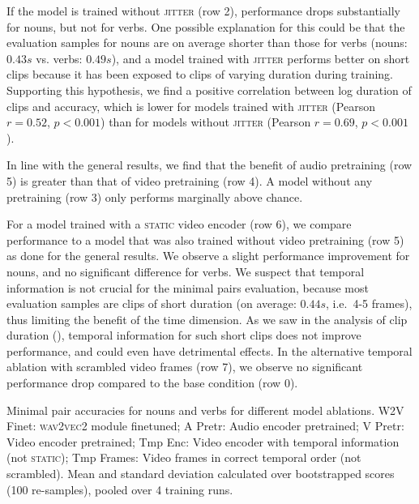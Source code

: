 If the model is trained without \textsc{jitter} (row 2), performance drops substantially
for nouns, but not for verbs. One possible explanation for this could be that 
the evaluation samples for nouns are on average shorter than those for verbs 
(nouns: $0.43s$ vs. verbs: $0.49s$), and a model trained with \textsc{jitter} 
performs better on short clips because it has been exposed to clips of varying 
duration during training. Supporting this hypothesis, we find a positive 
correlation between log duration of clips and accuracy, which is lower for 
models trained with \textsc{jitter} (Pearson $r= 0.52$, $p < 0.001$) than for 
models without \textsc{jitter} (Pearson $r= 0.69$, $p < 0.001$).

In line with the general results, we find that the benefit of audio pretraining 
(row 5) is greater than that of video pretraining (row 4). A model without any 
pretraining (row 3) only performs marginally above chance.

For a model trained with a \textsc{static} video encoder (row 6), we compare 
performance to a model that was also trained without video pretraining (row 5) 
as done for the general results. We observe a slight performance 
improvement for nouns, and no significant difference for
verbs.
We suspect that temporal information is not crucial for the minimal pairs evaluation, 
because most evaluation samples are clips of short duration (on average: 
$0.44s$, i.e.\ 4-5 frames), thus limiting the benefit of the time dimension.
As we saw in the analysis of clip duration (), 
temporal information for such short clips does not improve performance, and 
could even have detrimental effects. In the alternative temporal ablation 
with scrambled video frames (row 7), we observe no significant performance 
drop compared to the base condition (row 0).
\begin{table}[htb]
	\centering
	
	\caption{Minimal pair accuracies for nouns and verbs for different model 
		ablations. W2V Finet: \textsc{wav2vec2} module finetuned; A Pretr: 
		Audio encoder pretrained; V Pretr: Video encoder pretrained; Tmp 
		Enc: Video encoder with temporal information (not \textsc{static}); 
		Tmp Frames: Video frames in correct temporal order (not scrambled). 
		Mean and standard 
		deviation calculated over bootstrapped scores (100 re-samples), pooled 
		over 4 training runs.}
	\label{tab:minimal_pair_results}
\end{table}


